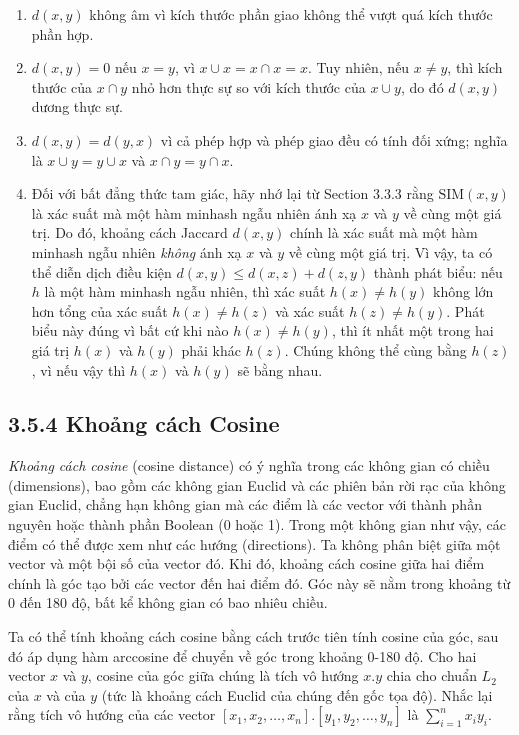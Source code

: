 \begin{enumerate}
  \item $d(x,y)$ không âm vì kích thước phần giao không thể vượt quá kích thước phần hợp.
  \item $d(x,y) = 0$ nếu $x = y$, vì $x \cup x = x \cap x = x$. Tuy nhiên, nếu $x \neq y$, thì kích thước của $x \cap y$ nhỏ hơn thực sự so với kích thước của $x \cup y$, do đó $d(x,y)$ dương thực sự.
  \item $d(x,y) = d(y,x)$ vì cả phép hợp và phép giao đều có tính đối xứng; nghĩa là $x \cup y = y \cup x$ và $x \cap y = y \cap x$.
  \item Đối với bất đẳng thức tam giác, hãy nhớ lại từ Section 3.3.3 rằng $\text{SIM}(x,y)$ là xác suất mà một hàm minhash ngẫu nhiên ánh xạ $x$ và $y$ về cùng một giá trị. Do đó, khoảng cách Jaccard $d(x,y)$ chính là xác suất mà một hàm minhash ngẫu nhiên \emph{không} ánh xạ $x$ và $y$ về cùng một giá trị. Vì vậy, ta có thể diễn dịch điều kiện $d(x,y) \leq d(x,z)+d(z,y)$ thành phát biểu: nếu $h$ là một hàm minhash ngẫu nhiên, thì xác suất $h(x) \neq h(y)$ không lớn hơn tổng của xác suất $h(x) \neq h(z)$ và xác suất $h(z) \neq h(y)$. Phát biểu này đúng vì bất cứ khi nào $h(x) \neq h(y)$, thì ít nhất một trong hai giá trị $h(x)$ và $h(y)$ phải khác $h(z)$. Chúng không thể cùng bằng $h(z)$, vì nếu vậy thì $h(x)$ và $h(y)$ sẽ bằng nhau.
\end{enumerate}

\subsection*{3.5.4 Khoảng cách Cosine}

\emph{Khoảng cách cosine} (cosine distance) có ý nghĩa trong các không gian có chiều (dimensions), bao gồm các không gian Euclid và các phiên bản rời rạc của không gian Euclid, chẳng hạn không gian mà các điểm là các vector với thành phần nguyên hoặc thành phần Boolean (0 hoặc 1). Trong một không gian như vậy, các điểm có thể được xem như các hướng (directions). Ta không phân biệt giữa một vector và một bội số của vector đó. Khi đó, khoảng cách cosine giữa hai điểm chính là góc tạo bởi các vector đến hai điểm đó. Góc này sẽ nằm trong khoảng từ 0 đến 180 độ, bất kể không gian có bao nhiêu chiều.

Ta có thể tính khoảng cách cosine bằng cách trước tiên tính cosine của góc, sau đó áp dụng hàm arccosine để chuyển về góc trong khoảng 0-180 độ. Cho hai vector $x$ và $y$, cosine của góc giữa chúng là tích vô hướng $x.y$ chia cho chuẩn $L_2$ của $x$ và của $y$ (tức là khoảng cách Euclid của chúng đến gốc tọa độ). Nhắc lại rằng tích vô hướng của các vector $[x_1,x_2,\ldots,x_n].[y_1,y_2,\ldots,y_n]$ là $\sum_{i=1}^{n} x_i y_i$.

